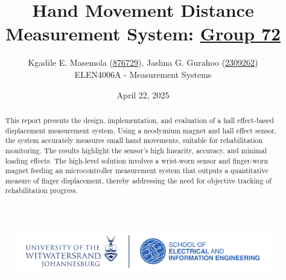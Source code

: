 \documentclass[a4paper,12pt]{article}
\begin{document}
\begin{titlepage}
\begin{figure}
\centering
\includegraphics[scale=0.5]{witseie100logo.png}  
\end{figure}
\title{Hand Movement Distance Measurement System: \underline{Group 72}}

\author{Kgadile E. Masemola (\underline{876729}), Jashna G. Gurahoo (\underline{2309262})\\ ELEN4006A - Measurement Systems}
\date{April 22, 2025}
\maketitle
%
\begin{abstract}
This report presents the design, implementation, and evaluation of a hall effect-based displacement measurement system. Using a neodymium magnet and hall effect sensor, the system accurately measures small hand movements, suitable for rehabilitation monitoring. The results highlight the sensor's high linearity, accuracy, and minimal loading effects. The high-level solution involves a wrist-worn sensor and finger-worn magnet feeding an microcontroller measurement system that outputs a quantitative measure of finger displacement, thereby addressing the need for objective tracking of rehabilitation progress.
\end{abstract}
\end{titlepage}



%
\end{document}

